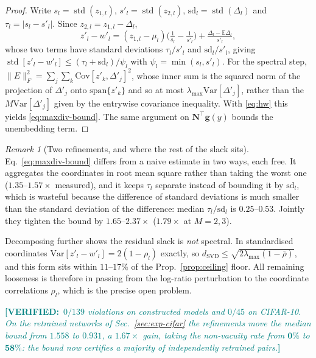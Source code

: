 \documentclass[10pt,letterpaper,twocolumn]{article}
\newcommand{\DONE}[1]{\textcolor{teal}{\small\textbf{[VERIFIED:}~\textit{#1}\textbf{]}}}
\newcommand{\bfg}{\mathbf{g}}
\newcommand{\bfN}{\mathbf{N}}
\newcommand{\dSVD}{d_{\mathrm{SVD}}}
\newcommand{\Var}{\mathrm{Var}}
\newcommand{\Cov}{\mathrm{Cov}}
\theoremstyle{plain}
\theoremstyle{definition}
\theoremstyle{remark}
\newtheorem{remark}[theorem]{Remark}
\begin{document}
\begin{proof}
Write $s_{l}=\operatorname{std}(z_{1,l})$, $s'_{l}=\operatorname{std}(z_{2,l})$,
$\mathrm{sd}_{l}=\operatorname{std}(\Delta_{l})$ and
$\tau_{l}=|s_{l}-s'_{l}|$. Since $z_{2,l}=z_{1,l}-\Delta_{l}$,
\[
z'_{l}-w'_{l}=(z_{1,l}-\mu_{l})\Big(\tfrac1{s_{l}}-\tfrac1{s'_{l}}\Big)
+\tfrac{\Delta_{l}-\mathbb{E}\Delta_{l}}{s'_{l}},
\]
whose two terms have standard deviations $\tau_{l}/s'_{l}$ and
$\mathrm{sd}_{l}/s'_{l}$, giving
$\operatorname{std}[z'_{l}-w'_{l}]\le(\tau_{l}+\mathrm{sd}_{l})/\psi_{l}$ with
$\psi_{l}=\min(s_{l},s'_{l})$. For the spectral step,
$\|E\|_{F}^{2}=\sum_{j}\sum_{k}\Cov[z'_{k},\Delta'_{j}]^{2}$, whose inner sum
is the squared norm of the projection of $\Delta'_{j}$ onto
$\mathrm{span}\{z'_{k}\}$ and so at most $\lambda_{\max}\Var[\Delta'_{j}]$,
rather than the $M\Var[\Delta'_{j}]$ given by the entrywise covariance
inequality. With \eqref{eq:hw} this yields \eqref{eq:maxdiv-bound}. The same
argument on $\bfN^{\top}\bfg(y)$ bounds the unembedding term.
\end{proof}

\begin{remark}[Two refinements, and where the rest of the slack sits]
\label{rem:tighten}
Eq.~\eqref{eq:maxdiv-bound} differs from a naive estimate in two ways, each
free. It aggregates the coordinates in root mean square rather than taking the
worst one ($1.35$--$1.57\times$ measured), and it keeps $\tau_{l}$ separate
instead of bounding it by $\mathrm{sd}_{l}$, which is wasteful because the
difference of standard deviations is much smaller than the standard deviation
of the difference: median $\tau_{l}/\mathrm{sd}_{l}$ is $0.25$--$0.53$. Jointly
they tighten the bound by $1.65$--$2.37\times$ ($1.79\times$ at $M=2,3$).

Decomposing further shows the residual slack is \emph{not} spectral. In
standardised coordinates $\Var[z'_{l}-w'_{l}]=2(1-\rho_{l})$ exactly, so
$\dSVD\le\sqrt{2\lambda_{\max}(1-\bar\rho)}$, and this form sits within
$11$--$17\%$ of the Prop.~\ref{prop:ceiling} floor. All remaining looseness is
therefore in passing from the log-ratio perturbation to the coordinate
correlations $\rho_{l}$, which is the precise open problem.
\end{remark}

\DONE{$0/139$ violations on constructed models and $0/45$ on CIFAR-10. On the
retrained networks of Sec.~\ref{sec:exp-cifar} the refinements move the median
bound from $1.558$ to $\mathbf{0.931}$, a $1.67\times$ gain, taking the
non-vacuity rate from $\mathbf{0\%}$ to $\mathbf{58\%}$: the bound now
certifies a majority of independently retrained pairs.}
\end{document}
